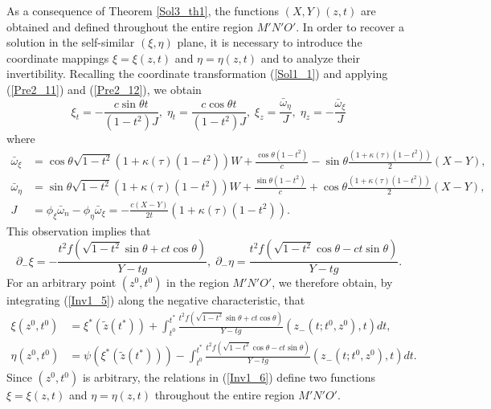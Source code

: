 \documentclass[3p,11pt]{elsarticle}
\numberwithin{equation}{section}
\begin{document}
As a consequence of Theorem \ref{Sol3_th1}, the functions $(X,Y)(z,t)$ are obtained and defined throughout the entire region $M'N'O'$. In order to recover a solution in the self-similar $(\xi,\eta)$ plane, it is necessary to introduce the coordinate mappings $\xi=\xi(z,t)$ and $\eta=\eta(z,t)$ and to analyze their invertibility. Recalling the coordinate transformation (\ref{Sol1_1}) and applying (\ref{Pre2_11}) and (\ref{Pre2_12}), we obtain
\begin{equation}\label{Inv1_4}
    \xi_t=-\frac{c\sin\theta t}{(1-t^2)J},\; \eta_t=\frac{c\cos\theta t}{(1-t^2)J},\; \xi_z=\frac{\bar\omega_\eta}{J},\;\eta_z=-\frac{\bar\omega_\xi}{J}
\end{equation}
where
\begin{equation}\label{Inv1_5}
    \begin{split}
       \bar\omega_\xi &=\cos\theta\sqrt{1-t^2} (1+\kappa(\tau)(1-t^2)){W}+\frac{\cos\theta(1-t^2)}{c}-\sin\theta\frac{(1+\kappa(\tau)(1-t^2))}{2}(  X- Y),\\
       \bar \omega_\eta &=\sin\theta\sqrt{1-t^2}(1+\kappa(\tau)(1-t^2)){W}+\frac{\sin\theta(1-t^2)}{c}+\cos\theta\frac{(1+\kappa(\tau)(1-t^2))}{2}(  X- Y),\\
        J &=\phi_\xi\bar\omega_n-\phi_\eta\bar\omega_\xi=-\frac{c({ X}-{ Y})}{2t}(1+\kappa(\tau)(1-t^2)).
    \end{split}
\end{equation}
This observation implies that
\begin{equation}\label{Inv1_6}
    \partial_-\xi=-\frac{t^2f(\sqrt{1-t^2}\sin\theta +ct\cos\theta)}{Y-tg}, \; \partial_-\eta=\frac{t^2f(\sqrt{1-t^2}\cos\theta -ct\sin\theta)}{Y-tg}.
\end{equation}
For an arbitrary point $(z^0, t^0)$ in the region $M'N'O'$, we therefore obtain, by integrating (\ref{Inv1_5}) along the negative characteristic, that
\begin{equation*}\label{Inv1_7}
    \begin{split}
        \xi(z^0,t^0) &= \xi^*(\tilde z(t^*))+\int_{t^0}^{t^*}\frac{t^2f(\sqrt{1-t^2}\sin\theta +ct\cos\theta)}{Y-tg}(z_{-}(t; t^0, z^0),t)dt,\\
        \eta(z^0,t^0) &= \psi(\xi^*(\tilde z(t^*)))-\int_{t^0}^{t^*}  \frac{t^2f(\sqrt{1-t^2}\cos\theta -ct\sin\theta)}{Y-tg} (z_{-}(t; t^0, z^0),t)dt.
    \end{split}
\end{equation*}
Since $(z^0, t^0)$ is arbitrary, the relations in (\ref{Inv1_6}) define two functions $\xi=\xi(z,t)$ and $\eta=\eta(z,t)$ throughout the entire region $M'N'O'$.
\end{document}
